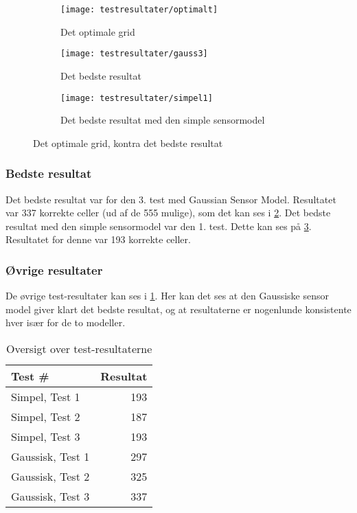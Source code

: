 \begin{figure}[h]
\centering
\begin{subfigure}[b]{.48\textwidth}
\centering
\texttt{[image: testresultater/optimalt]}
\caption{Det optimale grid}
\label{evaluering:optimaltgrid}
\end{subfigure}
\begin{subfigure}[b]{.48\textwidth}
\centering
\texttt{[image: testresultater/gauss3]}
\caption{Det bedste resultat}
\label{evaluering:gauss3}
\end{subfigure}
\begin{subfigure}[b]{.48\textwidth}
\centering
\texttt{[image: testresultater/simpel1]}
\caption{Det bedste resultat med den simple sensormodel}
\label{evaluering:simpel1}
\end{subfigure}
\caption{Det optimale grid, kontra det bedste resultat}
\label{evaluering:optvsbedst}
\end{figure}




\subsubsection*{Bedste resultat}
Det bedste resultat var for den 3. test med Gaussian Sensor Model.
Resultatet var 337 korrekte celler (ud af de 555 mulige), som det kan ses i \cref{evaluering:gauss3}. 
Det  bedste resultat med den simple sensormodel var den 1. test. 
Dette kan ses på \cref{evaluering:simpel1}.
Resultatet for denne var 193 korrekte celler.

\subsubsection*{Øvrige resultater}
De øvrige test-resultater kan ses i \cref{evaluering:testresultater}.
Her kan det ses at den Gaussiske sensor model giver klart det bedste resultat, og at resultaterne er nogenlunde konsistente hver især for de to modeller.

\begin{table}[h]
\centering
\begin{tabular}{|l|r|}
\hline
\textbf{Test \#} & \textbf{Resultat} \\ \hline \hline
Simpel, Test 1 & 193 \\ \hline
Simpel, Test 2 & 187 \\ \hline
Simpel, Test 3 & 193 \\ \hline \hline
Gaussisk, Test 1 & 297 \\ \hline
Gaussisk, Test 2 & 325 \\ \hline
Gaussisk, Test 3 & 337 \\ \hline
\end{tabular}
\caption{Oversigt over test-resultaterne}
\label{evaluering:testresultater}
\end{table}

